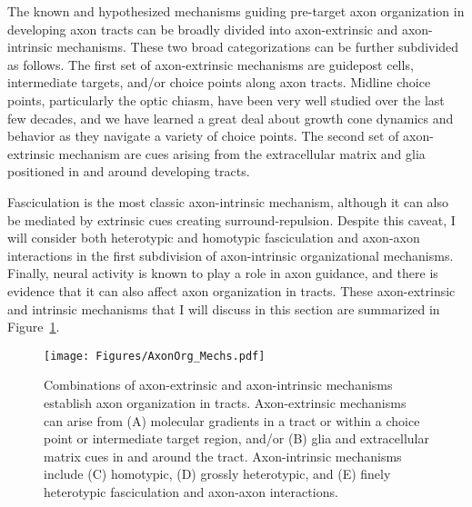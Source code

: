 \label{sec:MoleculesMechanisms}
The known and hypothesized mechanisms guiding pre-target axon organization in developing axon tracts can be broadly divided into axon-extrinsic and axon-intrinsic mechanisms.
These two broad categorizations can be further subdivided as follows.
The first set of axon-extrinsic mechanisms are guidepost cells, intermediate targets, and/or choice points along axon tracts.
Midline choice points, particularly the optic chiasm, have been very well studied over the last few decades, and we have learned a great deal about growth cone dynamics and behavior as they navigate a variety of choice points.
The second set of axon-extrinsic mechanism are cues arising from the extracellular matrix and glia positioned in and around developing tracts.

Fasciculation is the most classic axon-intrinsic mechanism, although it can also be mediated by extrinsic cues creating surround-repulsion.
Despite this caveat, I will consider both heterotypic and homotypic fasciculation and axon-axon interactions in the first subdivision of axon-intrinsic organizational mechanisms.
Finally, neural activity is known to play a role in axon guidance, and there is evidence that it can also affect axon organization in tracts.
These axon-extrinsic and intrinsic mechanisms that I will discuss in this section are summarized in Figure~\ref{AxonOrg_Mechs}.
\begin{figure}[hbtp]
    \begin{center}
    \texttt{[image: Figures/AxonOrg\_Mechs.pdf]}
    \caption[Common Mechanisms of Axon Organization in Tracts]{Combinations of axon-extrinsic and axon-intrinsic mechanisms establish axon organization in tracts. Axon-extrinsic mechanisms can arise from (A) molecular gradients in a tract or within a choice point or intermediate target region, and/or (B) glia and extracellular matrix cues in and around the tract. Axon-intrinsic mechanisms include (C) homotypic, (D) grossly heterotypic, and (E) finely heterotypic fasciculation and axon-axon interactions. \label{AxonOrg_Mechs}}
    \end{center}
\end{figure}